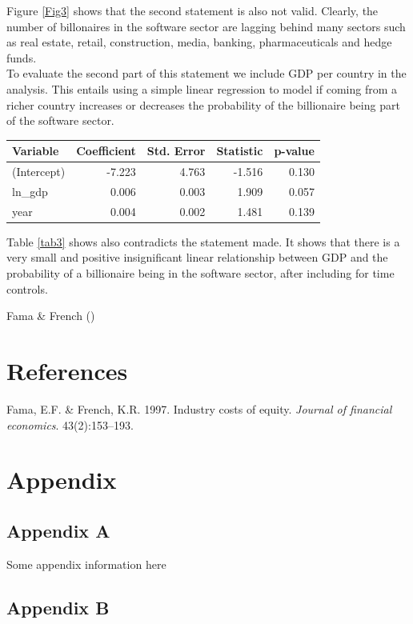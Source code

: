 \documentclass[11pt,preprint]{elsarticle}
\let\origtable\table
\let\endorigtable\endtable
\renewenvironment{table}[1][2] {
    \expandafter\origtable\expandafter[H]
} {
    \endorigtable
}
\numberwithin{equation}{section}
\numberwithin{figure}{section}
\numberwithin{table}{section}
\newlength{\cslhangindent}
\newenvironment{CSLReferences}[2] %
{\begin{list}{}{%
	\setlength{\itemindent}{0pt}
	\setlength{\leftmargin}{0pt}
	\setlength{\parsep}{0pt}
	\ifodd #1
	\setlength{\leftmargin}{\cslhangindent}
	\setlength{\itemindent}{-1\cslhangindent}
	\fi
	\setlength{\itemsep}{#2\baselineskip}}}
{\end{list}}
\begin{document}
Figure \ref{Fig3} shows that the second statement is also not valid.
Clearly, the number of billonaires in the software sector are lagging
behind many sectors such as real estate, retail, construction, media,
banking, pharmaceuticals and hedge funds.\\
To evaluate the second part of this statement we include GDP per country
in the analysis. This entails using a simple linear regression to model
if coming from a richer country increases or decreases the probability
of the billionaire being part of the software sector.

\begin{table}
\centering
\caption{\label{tab:unnamed-chunk-6}Table showing results of regression of log of GDP on the probability of being in the software sector \label{tab3}}
\centering
\begin{tabular}[t]{l|r|r|r|r}
\hline
Variable & Coefficient & Std. Error & Statistic & p-value\\
\hline
(Intercept) & -7.223 & 4.763 & -1.516 & 0.130\\
\hline
ln\_gdp & 0.006 & 0.003 & 1.909 & 0.057\\
\hline
year & 0.004 & 0.002 & 1.481 & 0.139\\
\hline
\end{tabular}
\end{table}

Table \ref{tab3} shows also contradicts the statement made. It shows
that there is a very small and positive insignificant linear
relationship between GDP and the probability of a billionaire being in
the software sector, after including for time controls.

Fama \& French ()

\newpage

\section*{References}\label{references}

\label{refs}
\begin{CSLReferences}{1}{1}
Fama, E.F. \& French, K.R. 1997. Industry costs of equity. \emph{Journal
of financial economics}. 43(2):153--193.

\end{CSLReferences}

\section*{Appendix}\label{appendix}

\subsection*{Appendix A}\label{appendix-a}

Some appendix information here

\subsection*{Appendix B}\label{appendix-b}


\end{document}
